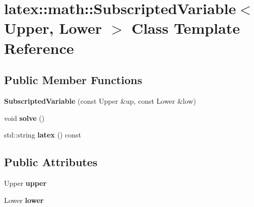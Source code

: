 \hypertarget{classlatex_1_1math_1_1SubscriptedVariable}{\section{latex\-:\-:math\-:\-:Subscripted\-Variable$<$ Upper, Lower $>$ Class Template Reference}
\label{classlatex_1_1math_1_1SubscriptedVariable}
}
\subsection*{Public Member Functions}
\begin{DoxyCompactItemize}
\item 
\hypertarget{classlatex_1_1math_1_1SubscriptedVariable_a01379fa1ca54ff2c24925e2f4cf588fb}{{\bfseries Subscripted\-Variable} (const Upper \&up, const Lower \&low)}\label{classlatex_1_1math_1_1SubscriptedVariable_a01379fa1ca54ff2c24925e2f4cf588fb}

\item 
\hypertarget{classlatex_1_1math_1_1SubscriptedVariable_ab5203d3b8e0b98cc8ffd132faee47fc1}{void {\bfseries solve} ()}\label{classlatex_1_1math_1_1SubscriptedVariable_ab5203d3b8e0b98cc8ffd132faee47fc1}

\item 
\hypertarget{classlatex_1_1math_1_1SubscriptedVariable_a105cdaf00548080f2adb1941f21ef0e0}{std\-::string {\bfseries latex} () const }\label{classlatex_1_1math_1_1SubscriptedVariable_a105cdaf00548080f2adb1941f21ef0e0}

\end{DoxyCompactItemize}
\subsection*{Public Attributes}
\begin{DoxyCompactItemize}
\item 
\hypertarget{classlatex_1_1math_1_1SubscriptedVariable_ad840053085689eeb300eba0f8abdd365}{Upper {\bfseries upper}}\label{classlatex_1_1math_1_1SubscriptedVariable_ad840053085689eeb300eba0f8abdd365}

\item 
\hypertarget{classlatex_1_1math_1_1SubscriptedVariable_aaa25b87641633bc574072c06830ba371}{Lower {\bfseries lower}}\label{classlatex_1_1math_1_1SubscriptedVariable_aaa25b87641633bc574072c06830ba371}

\end{DoxyCompactItemize}
